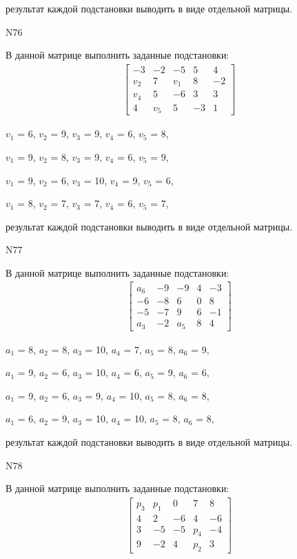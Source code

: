 \documentclass[11pt]{report}
\begin{document}
результат каждой подстановки выводить в виде отдельной матрицы.

N76

В данной матрице выполнить заданные подстановки:
\begin{align*}
\left[\begin{matrix}-3 & -2 & -5 & 5 & 4\\v_{2} & 7 & v_{1} & 8 & -2\\v_{4} & 5 & -6 & 3 & 3\\4 & v_{5} & 5 & -3 & 1\end{matrix}\right]
\end{align*}


$v_{1}$ = 6, $v_{2}$ = 9, $v_{3}$ = 9, $v_{4}$ = 6, $v_{5}$ = 8, 

$v_{1}$ = 9, $v_{2}$ = 8, $v_{3}$ = 9, $v_{4}$ = 6, $v_{5}$ = 9, 

$v_{1}$ = 9, $v_{2}$ = 6, $v_{3}$ = 10, $v_{4}$ = 9, $v_{5}$ = 6, 

$v_{1}$ = 8, $v_{2}$ = 7, $v_{3}$ = 7, $v_{4}$ = 6, $v_{5}$ = 7, 

результат каждой подстановки выводить в виде отдельной матрицы.

N77

В данной матрице выполнить заданные подстановки:
\begin{align*}
\left[\begin{matrix}a_{6} & -9 & -9 & 4 & -3\\-6 & -8 & 6 & 0 & 8\\-5 & -7 & 9 & 6 & -1\\a_{3} & -2 & a_{5} & 8 & 4\end{matrix}\right]
\end{align*}


$a_{1}$ = 8, $a_{2}$ = 8, $a_{3}$ = 10, $a_{4}$ = 7, $a_{5}$ = 8, $a_{6}$ = 9, 

$a_{1}$ = 9, $a_{2}$ = 6, $a_{3}$ = 10, $a_{4}$ = 6, $a_{5}$ = 9, $a_{6}$ = 6, 

$a_{1}$ = 9, $a_{2}$ = 6, $a_{3}$ = 9, $a_{4}$ = 10, $a_{5}$ = 8, $a_{6}$ = 8, 

$a_{1}$ = 6, $a_{2}$ = 9, $a_{3}$ = 10, $a_{4}$ = 10, $a_{5}$ = 8, $a_{6}$ = 8, 

результат каждой подстановки выводить в виде отдельной матрицы.

N78

В данной матрице выполнить заданные подстановки:
\begin{align*}
\left[\begin{matrix}p_{3} & p_{1} & 0 & 7 & 8\\4 & 2 & -6 & 4 & -6\\3 & -5 & -5 & p_{4} & -4\\9 & -2 & 4 & p_{2} & 3\end{matrix}\right]
\end{align*}
\end{document}
